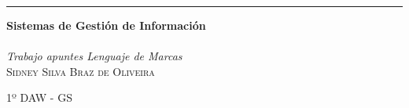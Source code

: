 \documentclass{article}
\begin{document}
\begin{titlepage}
	
	\raggedleft
	
	\rule{1pt}{\textheight}
	\hspace{0.05\textwidth}
	\parbox[b]{0.75\textwidth}{
		
		{\Huge\bfseries Sistemas de Gestión de Información \\[0\baselineskip]} \\[0\baselineskip]
		{\large\textit{Trabajo apuntes Lenguaje de Marcas}}\\[4\baselineskip]
		{\Large\textsc{Sidney Silva Braz de Oliveira}}
		
		\vspace{0.5\textheight}
		
		{\noindent 1º DAW - GS}\\[\baselineskip]
	}

\end{titlepage}
\end{document}
